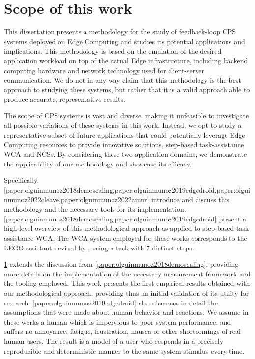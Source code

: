 \section{Scope of this work}

This dissertation presents a methodology for the study of feedback-loop \gls{CPS} systems deployed on Edge Computing and studies its potential applications and implications.
This methodology is based on the emulation of the desired application workload on top of the actual Edge infrastructure, including backend computing hardware and network technology used for client-server communication.
We do not in any way claim that this methodology is the best approach to studying these systems, but rather that it is a valid approach able to produce accurate, representative results.

The scope of \gls{CPS} systems is vast and diverse, making it unfeasible to investigate all possible variations of these systems in this work. 
Instead, we opt to study a representative subset of future applications that could potentially leverage Edge Computing resources to provide innovative solutions, step-based task-assistance \gls{WCA} and \glspl{NCS}.
By considering these two application domains, we demonstrate the applicability of our methodology and showcase its efficacy.

Specifically, \cref{paper:olguinmunoz2018demoscaling,paper:olguinmunoz2019edgedroid,paper:olguinmunoz2022cleave,paper:olguinmunoz2022ainur} introduce and discuss this methodology and the necessary tools for its implementation.
\cref{paper:olguinmunoz2018demoscaling,paper:olguinmunoz2019edgedroid} present a high level overview of this methodological approach as applied to step-based task-assistance \gls{WCA}.
The \gls{WCA} system employed for these works corresponds to the LEGO assistant devised by \citeauthor{chen2015early}\cite{chen2015early}, using a task with \num{7} distinct steps.


\cref{} extends the discussion from \cref{paper:olguinmunoz2018demoscaling}, providing more details on the implementation of the necessary measurement framework and the tooling employed.
This work presents the first empirical results obtained with our methodological approach, providing thus an initial validation of its utility for research.
\cref{paper:olguinmunoz2019edgedroid} also discusses in detail the assumptions that were made about human behavior and reactions.
We assume in these works a human which is impervious to poor system performance, and suffers no annoyance, fatigue, frustration, nausea or other shortcomings of real human users.
The result is a model of a user who responds in a precisely reproducible and deterministic manner to the same system stimulus every time.

